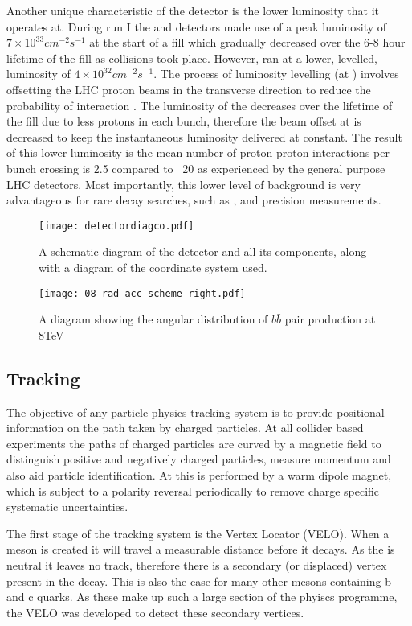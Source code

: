 Another unique characteristic of the \lhcb detector is the lower luminosity that it operates at.  During run I the \atlas and \cms detectors made use of a peak luminosity of $7\times 10^{33}cm^{-2}s^{-1}$ at the start of a fill which gradually decreased over the 6-8 hour lifetime of the fill as collisions took place.  However, \lhcb ran at a lower, levelled, luminosity of $4\times 10^{32}cm^{-2}s^{-1}$.  The process of luminosity levelling (at \lhcb) involves offsetting the LHC proton beams in the transverse direction to reduce the probability of interaction \cite{Follin:2014nva}.  The luminosity of the \lhc decreases over the lifetime of the fill due to less protons in each bunch, therefore the beam offset at \lhcb is decreased to keep the instantaneous luminosity delivered at \lhcb constant.  The result of this lower luminosity is the mean number of proton-proton interactions per bunch crossing is 2.5 compared to ~20 as experienced by the general purpose LHC detectors.  Most importantly, this lower level of background is very advantageous for rare decay searches, such as \Bs \to \muon \muon, and precision measurements.
\begin{figure}[h]
  \centering
  \texttt{[image: detectordiagco.pdf]}
  \caption{ A schematic diagram of the \lhcb detector and all its components, along with a diagram of the coordinate system used.}
  \label{fig:detectdiag}
\end{figure}
\begin{figure}[h]
  \centering
  \texttt{[image: 08\_rad\_acc\_scheme\_right.pdf]}
  \caption{A diagram showing the angular distribution of $b \bar{b}$ pair production at 8TeV}
  \label{fig:bbarprod}
\end{figure}
\subsection{Tracking}
\label{sec:Tracking}
The objective of any particle physics tracking system is to provide positional information on the path taken by charged particles.  At all collider based experiments the paths of charged particles are curved by a magnetic field to distinguish positive and negatively charged particles, measure momentum and also aid particle identification.  At \lhcb this is performed by a warm dipole magnet, which is subject to a polarity reversal periodically to remove charge specific systematic uncertainties.

The first stage of the \lhcb tracking system is the Vertex Locator (VELO).  When a \Bd meson is created it will travel a measurable distance before it decays.  As the \Bd is neutral it leaves no track, therefore there is a secondary (or displaced) vertex present in the decay.  This is also the case for many other mesons containing b and c quarks.  As these make up such a large section of the \lhcb phyiscs programme, the VELO was developed to detect these secondary vertices.

